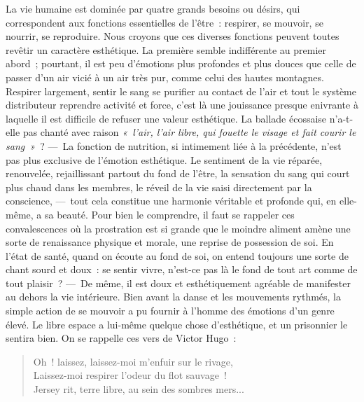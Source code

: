 \documentclass[french,twoside]{book} %
\begin{document}
La vie humaine est dominée par quatre grands besoins ou désirs, qui correspondent aux fonctions essentielles de l’être : respirer, se mouvoir, se nourrir, se reproduire. Nous croyons que ces diverses fonctions peuvent toutes revêtir un caractère esthétique. La première semble indifférente au premier abord ; pourtant, il est peu d’émotions plus profondes et plus douces que celle de passer d’un air vicié à un air très pur, comme celui des hautes montagnes. Respirer largement, sentir le sang se purifier au contact de l’air et tout le système distributeur reprendre activité et force, c’est là une jouissance presque enivrante  à laquelle il est difficile de refuser une valeur esthétique. La ballade écossaise n’a-t-elle pas chanté avec raison \emph{« l’air, l’air libre, qui fouette le visage et fait courir le sang »} ? — La fonction de nutrition, si intimement liée à la précédente, n’est pas plus exclusive de l’émotion esthétique. Le sentiment de la vie réparée, renouvelée, rejaillissant partout du fond de l’être, la sensation du sang qui court plus chaud dans les membres, le réveil de la vie saisi directement par la conscience, — tout cela constitue une harmonie véritable et profonde qui, en elle-même, a sa beauté. Pour bien le comprendre, il faut se rappeler ces convalescences où la prostration est si grande que le moindre aliment amène une sorte de renaissance physique et morale, une reprise de possession de soi. En l’état de santé, quand on écoute au fond de soi, on entend toujours une sorte de chant sourd et doux : se sentir vivre, n’est-ce pas là le fond de tout art comme de tout plaisir ? — De même, il est doux et esthétiquement agréable de manifester au dehors la vie intérieure. Bien avant la danse et les mouvements rythmés, la simple action de se mouvoir a pu fournir à l’homme des émotions d’un genre élevé. Le libre espace a lui-même quelque chose d’esthétique, et un prisonnier le sentira bien. On se rappelle ces vers de Victor Hugo :\par


\begin{verse}
Oh ! laissez, laissez-moi m’enfuir sur le rivage,\\
Laissez-moi respirer l’odeur du flot sauvage !\\
Jersey rit, terre libre, au sein des sombres mers...\\
\end{verse}
\end{document}
